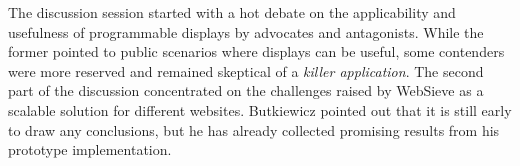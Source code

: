 The discussion session started with a hot debate on the applicability
and usefulness of programmable displays by advocates and antagonists.
While the former pointed to public scenarios where displays can be
useful, some contenders were more reserved and remained skeptical of a
\emph{killer application}. The second part of the discussion
concentrated on the challenges raised by WebSieve as a scalable
solution for different websites. Butkiewicz pointed out that it is still
early to draw any conclusions, but he has already collected promising
results from his prototype implementation.
